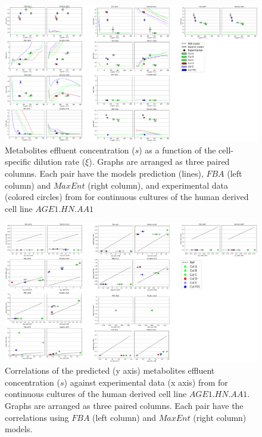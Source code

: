 \documentclass[]{article}
\begin{document}
	\begin{figure}
		\centering
		\includegraphics[scale = 0.6]{plots_s_Human}
		\caption{Metabolites effluent concentration ($s$) as a function of the cell-specific dilution rate ($\xi$). Graphs are arranged as three paired columns. Each pair have the models prediction (lines),  $FBA$ (left column) and $MaxEnt$ (right column), and experimental data (colored circles) from \protect{} for continuous cultures of the human derived cell line $AGE1.HN.AA1$}
	\end{figure}

	\begin{figure}
		\centering
		\includegraphics[scale = 0.6]{corr_s_Human}
		\caption{Correlations of the predicted (y axis) metabolites effluent concentration ($s$) against experimental data (x axis) from \protect{} for continuous cultures of the human derived cell line $AGE1.HN.AA1$. Graphs are arranged as three paired columns. Each pair have the correlations using $FBA$ (left column) and $MaxEnt$ (right column) models.}
	\end{figure}	
	
	\newpage
	
	
\end{document}
